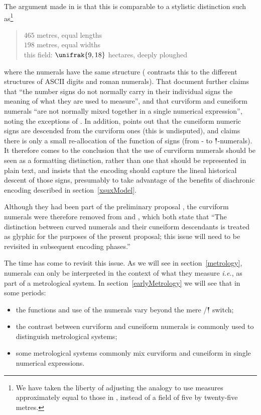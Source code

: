 \documentclass[10pt, a4paper, twoside]{article}
\newcommand\oneAšC{\symbol{"E55D}} %
\newcommand{\idest}{\emph{i.e.}}
\begin{document}
The argument made in \cite[4]{L2/04-099} is that this is comparable to a stylistic distinction such as\footnote{We
have taken the liberty of adjusting the analogy to use measures approximately equal to those in \cite{P020054},
instead of a field of five by twenty-five metres.}
\begin{quote}
$465$ metres, equal lengths\\
$198$ metres, equal widths\\
this field: $\unifrak{9,18}$ hectares, deeply ploughed
\end{quote}
where the numerals have the same structure (\cite{L2/04-099} contrasts this to the different structures
of ASCII digits and roman numerals).
That document further claims that ``the number signs do not normally carry in their individual signs the
meaning of what they are used to measure'', and that curviform and cuneiform numerals ``are not normally mixed together
in a single numerical expression'', noting the exceptions of \cites{P232278}{P232280}.
In addition, \cite[4]{L2/04-099} points out that the cuneiform numeric signs are descended from
the curviform ones (this is undisputed),
and claims there is only a small re-allocation of the function of signs
(from {\curviform \oneAšC}- to {\xsuxfont 𒁹}-numerals).
It therefore comes to the conclusion that the use of curviform
numerals should be seen as a formatting distinction,
rather than one that should be represented in plain text,
and insists that the encoding should capture the lineal
historical descent of those signs, presumably to take
advantage of the benefits of diachronic encoding described
in section~\ref{xsuxModel}.

Although they had been part of the preliminary proposal \cite{L2/03-393R},
the curviform numerals were therefore removed from \cite{L2/04-036} and \cite{L2/04-189},
which both state that ``The distinction between curved numerals and their cuneiform descendants
is treated as glyphic for the purposes of the present proposal;
this issue will need to be revisited in subsequent encoding phases.''

The time has come to revisit this issue.
As we will see in section~\ref{metrology},
numerals can only be interpreted in the context of what they measure \idest,
as part of a metrological system.
In section~\ref{earlyMetrology} we will see that in some periods:
\begin{itemize}[nosep]
  \item the functions and use of the numerals vary beyond the mere {\curviform \oneAšC}/{\xsuxfont 𒁹} switch;
  \item the contrast between curviform and cuneiform numerals is commonly used to distinguish metrological systems;
  \item some metrological systems commonly mix curviform and cuneiform in single numerical expressions.
\end{itemize}
\end{document}
